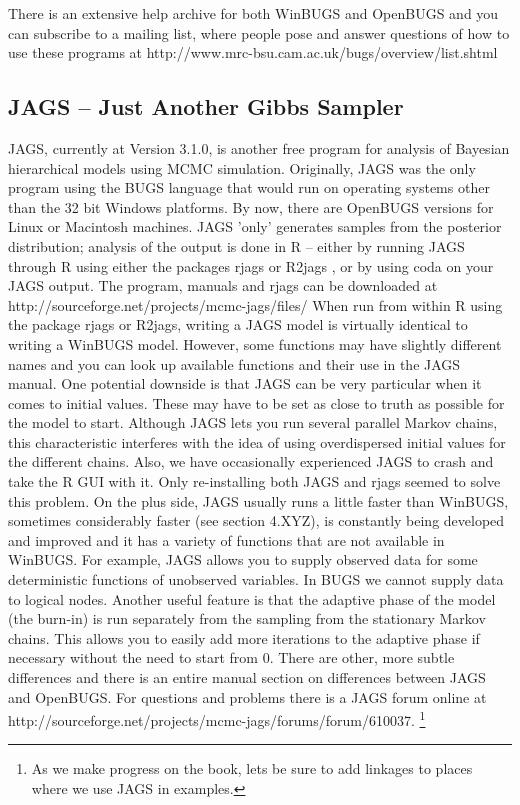 There is an extensive help archive for both WinBUGS and OpenBUGS and you can subscribe to a mailing list, where people pose and answer questions of how to use these programs at http://www.mrc-bsu.cam.ac.uk/bugs/overview/list.shtml

\subsection{JAGS – Just Another Gibbs Sampler}
JAGS, currently at Version 3.1.0, is another free program for analysis of Bayesian hierarchical models using MCMC simulation. Originally, JAGS was the only program using the BUGS language that would run on operating systems other than the 32 bit Windows platforms. By now, there are OpenBUGS versions for Linux or Macintosh machines.
JAGS 'only' generates samples from the posterior distribution; analysis of the output is done in R – either by running JAGS through R using either the packages rjags \citep{plummer:2011} or R2jags \citep{su_yajima:2011}, or by using coda on your JAGS output. The program, manuals and rjags can be downloaded at http://sourceforge.net/projects/mcmc-jags/files/
When run from within R using the package rjags or R2jags, writing a JAGS model is virtually identical to writing a WinBUGS model. However, some functions may have slightly different names and you can look up available functions and their use in the JAGS manual. One potential downside is that JAGS can be very particular when it comes to initial values. These may have to be set as close to truth as possible for the model to start. Although JAGS lets you run several parallel Markov chains, this characteristic interferes with the idea of using overdispersed initial values for the different chains. Also, we have occasionally experienced JAGS to crash and take the R GUI with it. Only re-installing both JAGS and rjags seemed to solve this problem.
On the plus side, JAGS usually runs a little faster than WinBUGS, sometimes considerably faster (see section 4.XYZ), is constantly being developed and improved and it has a variety of functions that are not available in WinBUGS. For example, JAGS allows you to supply observed data for some deterministic functions of unobserved variables. In BUGS we cannot supply data to logical nodes. Another useful feature is that the adaptive phase of the model (the burn-in) is run separately from the sampling from the stationary Markov chains. This allows you to easily add more iterations to the adaptive phase if necessary without the need to start from 0. There are other, more subtle differences and there is an entire manual section on differences between JAGS and OpenBUGS.
For questions and problems there is a JAGS forum online at http://sourceforge.net/projects/mcmc-jags/forums/forum/610037.
\footnote{As we make progress on the book, lets be sure  to add linkages to places where we use JAGS in examples.}

